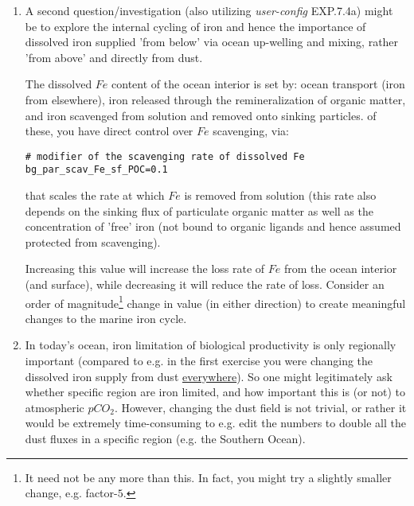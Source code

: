 \documentclass[11pt,fleqn]{book} %
\begin{document}
\begin{enumerate}[noitemsep]
\vspace{1mm}
\item A second question/investigation (also utilizing \textit{user-config} \textsf{\footnotesize EXP.7.4a}) might be to explore the internal cycling of iron and hence the importance of dissolved iron supplied 'from below' via ocean up-welling and mixing, rather 'from above' and directly from dust.

The dissolved \(Fe\) content of the ocean interior is set by: ocean transport (iron from elsewhere), iron released through the remineralization of organic matter, and iron scavenged from solution and removed onto sinking particles. of these, you have direct control over \(Fe\) scavenging, via:
\vspace{-1mm}\small\begin{verbatim}
# modifier of the scavenging rate of dissolved Fe
bg_par_scav_Fe_sf_POC=0.1
\end{verbatim}\normalsize\vspace{-1mm}
that scales the rate at which \(Fe\) is removed from solution (this rate also depends on the sinking flux of particulate organic matter as well as the concentration of 'free' iron (not bound to organic ligands and hence assumed protected from scavenging).

Increasing this value will increase the loss rate of \(Fe\) from the ocean interior (and surface), while decreasing it will reduce the rate of loss. Consider an order of magnitude\footnote{It need not be any more than this. In fact, you might try a slightly smaller change, e.g. factor-\(5\).} change in value (in either direction) to create meaningful changes to the marine iron cycle.

\vspace{1mm}
\item In today's ocean, iron limitation of biological productivity is only regionally important (compared to e.g. in the first exercise you were changing the dissolved iron supply from dust \uline{everywhere}). So one might legitimately ask whether specific region are iron limited, and how important this is (or not) to atmospheric \(pCO_{2}\). However, changing the dust field is not trivial, or rather it would be extremely time-consuming to e.g. edit the numbers to double all the dust fluxes in a specific region (e.g. the Southern Ocean).


\end{enumerate}
\end{document}
